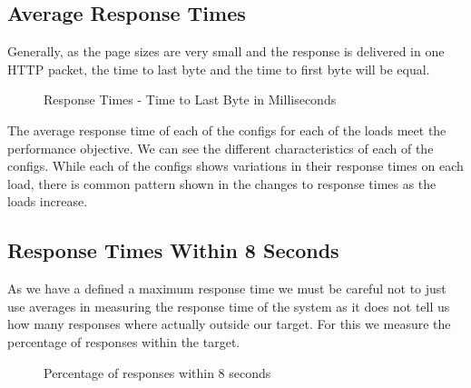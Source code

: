 \subsection*{Average Response Times} 
Generally, as the page sizes are very small and the response is delivered in one HTTP packet, the time to last byte and the time to first byte will be equal.

\begin{figure}[h]
\centering
{}
\caption{Response Times - Time to Last Byte in Milliseconds}
\label{fig:4.3}
\end{figure}

The average response time of each of the configs for each of the loads meet the performance objective. We can see the different characteristics of each of the configs. While each of the configs shows variations in their response times on each load, there is common pattern shown in the changes to response times as the loads increase. 

\subsection*{Response Times Within 8 Seconds}
As we have a defined a maximum response time we must be careful not to just use averages in measuring the response time of the system as it does not tell us how many responses where actually outside our target. For this we measure the percentage of responses within the target.


\begin{figure}[h]
\centering
{}
\caption{Percentage of responses within 8 seconds}
\label{fig:4.4}
\end{figure}

